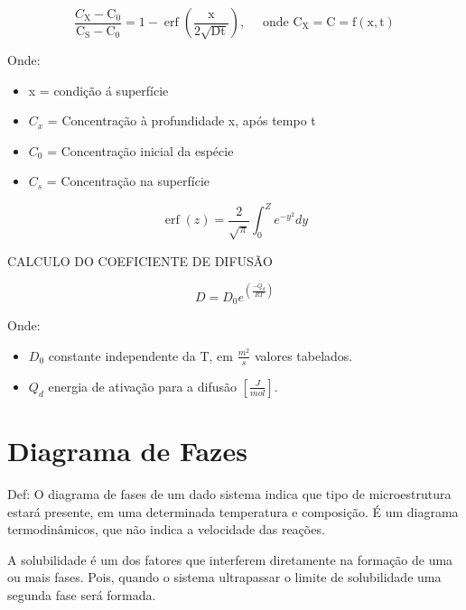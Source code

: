 \begin{equation}\label{key}
\frac{C_{\mathrm{X}}-\mathrm{C}_{0}}{\mathrm{C}_{\mathrm{S}}-\mathrm{C}_{0}}=1-\operatorname{erf}\left(\frac{\mathrm{x}}{2 \sqrt{\mathrm{D} \mathrm{t}}}\right), \quad \text { onde } \mathrm{C}_{\mathrm{X}}=\mathrm{C}=\mathrm{f}(\mathrm{x}, \mathrm{t})
\end{equation}

Onde:

\begin{itemize}
	\item x = condição á superfície
	\item $C_{x}$ = Concentração à profundidade x, após tempo t
	\item $C_{0}$ = Concentração inicial da espécie
	\item $C_{s}$ = Concentração na superfície
\end{itemize}


\begin{equation}\label{key}
\operatorname{erf}(z)=\frac{2}{\sqrt{\pi}} \int_{0}^{Z} e^{-y^{2}} d y
\end{equation}


CALCULO DO COEFICIENTE DE DIFUSÃO

\begin{equation}\label{key}
D=D_{0} e^{\left( \frac{-Q_{d}}{R T}  \right)}
\end{equation}

Onde:


\begin{itemize}
	\item $D_{0}$ constante independente da T, em $\frac{m^{2}}{s}$ valores tabelados.
	\item $Q_{d}$ energia de ativação para a difusão $[\frac{J}{mol}]$.
\end{itemize}



\section{Diagrama de Fazes}

Def: O diagrama de fases de um dado sistema indica que tipo de microestrutura estará presente, em uma determinada temperatura e composição. É um diagrama termodinâmicos, que não indica a velocidade das reações.

A solubilidade é um dos fatores que interferem diretamente na formação de uma ou mais fases. Pois, quando o sistema ultrapassar o limite de solubilidade uma segunda fase será formada.

